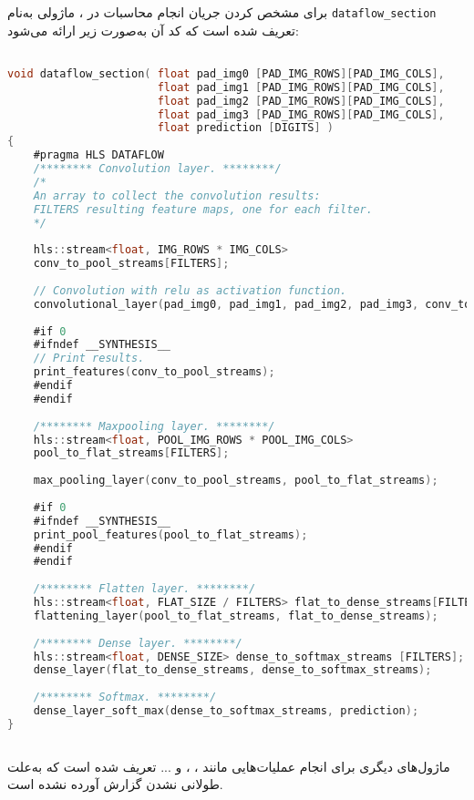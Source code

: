 برای مشخص کردن جریان انجام محاسبات در ، ماژولی به‌نام \texttt{dataflow\_section} تعریف شده است که کد آن به‌صورت زیر ارائه می‌شود:


\begin{latin}
\begin{lstlisting}[language=C,caption={HLS Implementation of \texttt{Data flow}  Module}]

void dataflow_section( float pad_img0 [PAD_IMG_ROWS][PAD_IMG_COLS],
					   float pad_img1 [PAD_IMG_ROWS][PAD_IMG_COLS],
					   float pad_img2 [PAD_IMG_ROWS][PAD_IMG_COLS],
					   float pad_img3 [PAD_IMG_ROWS][PAD_IMG_COLS],
					   float prediction [DIGITS] )
{
	#pragma HLS DATAFLOW
	/******** Convolution layer. ********/
	/*
	An array to collect the convolution results:
	FILTERS resulting feature maps, one for each filter.
	*/
	
	hls::stream<float, IMG_ROWS * IMG_COLS>
	conv_to_pool_streams[FILTERS];
	
	// Convolution with relu as activation function.
	convolutional_layer(pad_img0, pad_img1, pad_img2, pad_img3, conv_to_pool_streams);
	
	#if 0
	#ifndef __SYNTHESIS__
	// Print results.
	print_features(conv_to_pool_streams);
	#endif
	#endif
	
	/******** Maxpooling layer. ********/
	hls::stream<float, POOL_IMG_ROWS * POOL_IMG_COLS>
	pool_to_flat_streams[FILTERS];
	
	max_pooling_layer(conv_to_pool_streams, pool_to_flat_streams);
	
	#if 0
	#ifndef __SYNTHESIS__
	print_pool_features(pool_to_flat_streams);
	#endif
	#endif
	
	/******** Flatten layer. ********/
	hls::stream<float, FLAT_SIZE / FILTERS> flat_to_dense_streams[FILTERS];
	flattening_layer(pool_to_flat_streams, flat_to_dense_streams);
	
	/******** Dense layer. ********/
	hls::stream<float, DENSE_SIZE> dense_to_softmax_streams [FILTERS];
	dense_layer(flat_to_dense_streams, dense_to_softmax_streams);
	
	/******** Softmax. ********/
	dense_layer_soft_max(dense_to_softmax_streams, prediction);
}
	
\end{lstlisting}
\end{latin}



ماژول‌های دیگری برای انجام عملیات‌هایی مانند ، ،  و ... تعریف شده است که به‌علت طولانی نشدن گزارش آورده نشده است.




